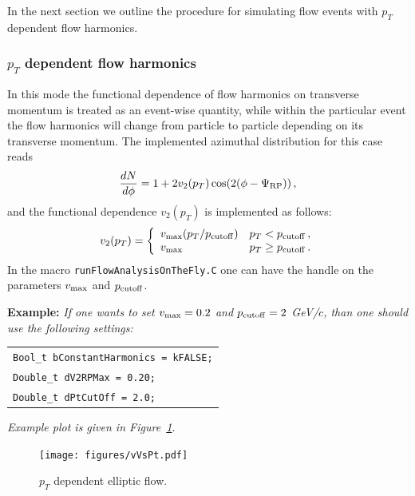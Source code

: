 \documentclass[a4paper]{book}
\numberwithin{equation}{subsection}
\begin{document}
\noindent In the next section we outline the procedure for simulating flow events with $p_T$ dependent flow harmonics.

\subsubsection{$p_T$ dependent flow harmonics}
In this mode the functional dependence of flow harmonics on transverse momentum is treated as an event-wise quantity, while within the particular event the flow harmonics will change from particle to particle depending on its transverse momentum. The implemented azimuthal distribution for this case reads 
%
\begin{equation}
\frac{dN}{d\phi} = 1+2v_2(p_T)\cos(2(\phi-\Psi_{\rm RP}))\,,
\label{azimuthalDistributionOnlyPtDependent}
\end{equation}
%
and the functional dependence $v_2(p_T)$ is implemented as follows:
%
\begin{equation}
v_2(p_T) = \left\{
\begin{array}{ll}
v_{\rm max}(p_T/p_{\rm cutoff}) & p_T < p_{\rm cutoff}\,, \\
v_{\rm max} & p_T \geq p_{\rm cutoff}\,. \\
\end{array}
\right.
\label{v(pt)parametrization}
\end{equation}
%
In the macro \texttt{runFlowAnalysisOnTheFly.C} one can have the handle on the parameters $v_{\rm max}$ and $p_{\rm cutoff}$.

\vspace{0.5cm}
\noindent\textbf{Example:} \textit{If one wants to set $v_{\rm max} = 0.2$ and $p_{\rm cutoff} = 2$ GeV/$c$, than one should use the following settings:}
%
\begin{center}
\begin{tabular}[t]{l}
\texttt{Bool\_t bConstantHarmonics = kFALSE;} \\
\texttt{Double\_t dV2RPMax = 0.20;} \\
\texttt{Double\_t dPtCutOff = 2.0;}
\end{tabular}
\end{center}
%
\textit{Example plot is given in Figure~\ref{vVsPt}}.
\vspace{0.5cm}

%
\begin{figure}
\begin{center}
  \texttt{[image: figures/vVsPt.pdf]}
  \caption{$p_T$ dependent elliptic flow.}
\label{vVsPt}
\end{center}
\end{figure}
%
\end{document}
